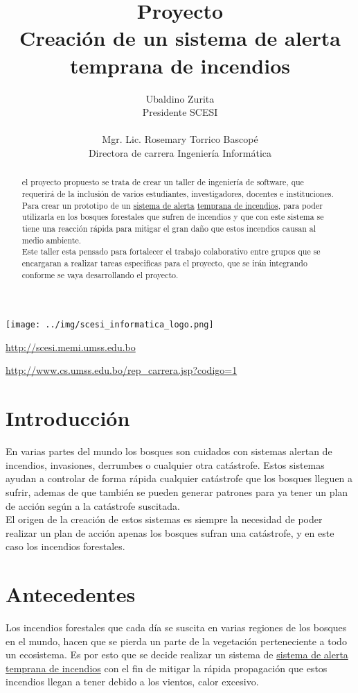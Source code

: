 \documentclass[letter,12pt]{article}
\title{Proyecto\\ Creación de un sistema de alerta temprana de incendios}
\author{Ubaldino Zurita\\{\normalsize Presidente SCESI}\\\\Mgr. Lic. Rosemary Torrico Bascopé\\{\normalsize Directora de carrera Ingeniería Informática}}
\begin{document}
\maketitle
\begin{center}
    \texttt{[image: ../img/scesi\_informatica\_logo.png]} 
\end{center}
\begin{center}
    \url {http://scesi.memi.umss.edu.bo}\\
\end{center}
\begin{center}
    \url{http://www.cs.umss.edu.bo/rep_carrera.jsp?codigo=1}
\end{center}
\pagebreak
\tableofcontents
\pagebreak
\begin{abstract}
el proyecto propuesto se trata de crear un taller de ingeniería de software, que requerirá de la inclusión de varios estudiantes, investigadores, docentes e instituciones. Para crear un prototipo de un \underline{sistema de alerta} \underline{temprana de incendios}, para poder utilizarla en los bosques forestales que sufren de incendios y que con este sistema se tiene una reacción rápida para mitigar el gran daño que estos incendios causan al medio ambiente.\\
Este taller esta pensado para fortalecer el trabajo colaborativo entre grupos que se encargaran a realizar tareas especificas para el proyecto, que se irán integrando conforme se vaya desarrollando el proyecto.
\end{abstract}
\pagebreak

\section{Introducci\'on}
En varias partes del mundo los bosques son cuidados con sistemas alertan de incendios, invasiones, derrumbes o cualquier otra catástrofe. Estos sistemas ayudan a controlar de forma rápida cualquier catástrofe que los bosques lleguen a sufrir, ademas de que también se pueden generar patrones para ya tener un plan de acción según a la catástrofe suscitada.\\
El origen de la creación de estos sistemas es siempre la necesidad de poder realizar un plan de acción apenas los bosques sufran una catástrofe, y en este caso los incendios forestales.
\section{Antecedentes}
Los incendios forestales que cada día se suscita en varias regiones de los bosques en el mundo, hacen que se pierda un parte de la vegetación perteneciente a todo un ecosistema. Es por esto que se decide realizar un sistema de \underline{sistema de alerta temprana de incendios} con el fin de mitigar la rápida propagación que estos incendios llegan a tener debido a los vientos, calor excesivo. 
\end{document}

